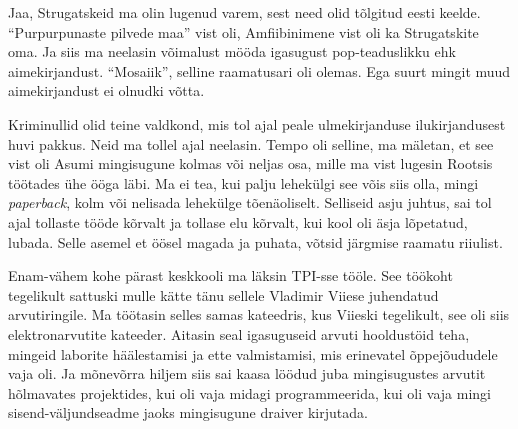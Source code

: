 Jaa, Strugatskeid ma olin lugenud varem, sest need olid tõlgitud eesti keelde. \enquote{Purpurpunaste pilvede maa} vist oli,  Amfiibinimene vist oli ka Strugatskite oma. Ja siis ma neelasin võimalust mööda igasugust pop-teaduslikku ehk aimekirjandust. \enquote{Mosaiik}, selline raamatusari oli olemas. Ega suurt mingit muud aimekirjandust ei olnudki võtta.

Kriminullid olid teine valdkond, mis tol ajal peale  ulmekirjanduse ilukirjandusest huvi pakkus. Neid ma tollel ajal neelasin. Tempo oli selline, ma mäletan, et see vist oli Asumi mingisugune kolmas või neljas osa, mille ma vist lugesin Rootsis töötades ühe ööga läbi. Ma ei tea, kui palju lehekülgi see võis siis olla, mingi \emph{paperback}, kolm või nelisada lehekülge tõenäoliselt. Selliseid asju juhtus, sai tol ajal tollaste tööde kõrvalt ja tollase elu kõrvalt, kui  kool oli äsja lõpetatud, lubada. Selle asemel et öösel magada ja puhata, võtsid järgmise raamatu riiulist.


Enam-vähem kohe pärast keskkooli ma läksin TPI-sse tööle. See töökoht tegelikult sattuski mulle kätte tänu sellele Vladimir Viiese juhendatud arvutiringile. Ma töötasin selles samas kateedris, kus Viieski tegelikult, see oli siis elektronarvutite kateeder. Aitasin seal igasuguseid arvuti hooldustöid teha, mingeid laborite häälestamisi ja  ette valmistamisi, mis erinevatel õppejõududele vaja oli. Ja mõnevõrra hiljem siis sai kaasa löödud juba mingisugustes arvutit hõlmavates projektides,  kui oli vaja midagi programmeerida, kui oli vaja mingi sisend-väljundseadme jaoks mingisugune draiver kirjutada. 

